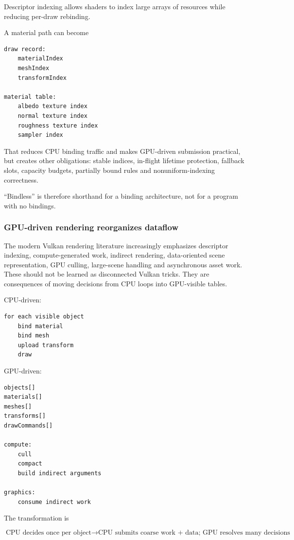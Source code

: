 Descriptor indexing allows shaders to index large arrays of resources while reducing per-draw rebinding.

A material path can become

\begin{verbatim}
draw record:
    materialIndex
    meshIndex
    transformIndex

material table:
    albedo texture index
    normal texture index
    roughness texture index
    sampler index
\end{verbatim}

That reduces CPU binding traffic and makes GPU-driven submission practical, but creates other obligations: stable indices, in-flight lifetime protection, fallback slots, capacity budgets, partially bound rules and nonuniform-indexing correctness.

``Bindless'' is therefore shorthand for a binding architecture, not for a program with no bindings.

\subsubsection{GPU-driven rendering reorganizes dataflow}\label{05-engine-i-ch023-gpu-driven-rendering-reorganizes-dataflow}

The modern Vulkan rendering literature increasingly emphasizes descriptor indexing, compute-generated work, indirect rendering, data-oriented scene representation, GPU culling, large-scene handling and asynchronous asset work. These should not be learned as disconnected Vulkan tricks. They are consequences of moving decisions from CPU loops into GPU-visible tables.

CPU-driven:

\begin{verbatim}
for each visible object
    bind material
    bind mesh
    upload transform
    draw
\end{verbatim}

GPU-driven:

\begin{verbatim}
objects[]
materials[]
meshes[]
transforms[]
drawCommands[]

compute:
    cull
    compact
    build indirect arguments

graphics:
    consume indirect work
\end{verbatim}

The transformation is

\[
\boxed{
\text{CPU decides once per object}
\rightarrow
\text{CPU submits coarse work + data; GPU resolves many decisions}
}
\]

